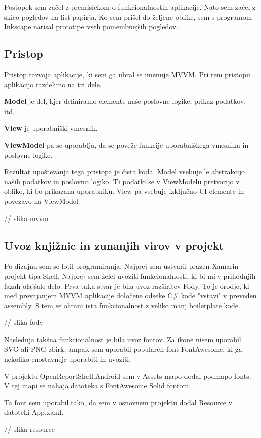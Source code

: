 \documentclass[a4paper, 12pt]{book}
\begin{document}
Postopek sem začel z premislekom o funkcionalnostih aplikacije.
Nato sem začel z skico pogledov na list papirja.
Ko sem prišel do željene oblike, sem s programom Inkscape narisal prototipe vseh pomembnejših pogledov.

\subsection{Pristop}
Pristop razvoja aplikacije, ki sem ga ubral se imenuje MVVM.
Pri tem pristopu aplikacijo razdelimo na tri dele.

\textbf{Model} je del, kjer definiramo elemente naše poslovne logike, prikaz podatkov, itd.

\textbf{View} je uporabniški vmesnik.

\textbf{ViewModel} pa se uporablja, da se poveže funkcije uporabniškega vmesnika in poslovne logike.

Rezultat upoštevanja tega pristopa je čista koda.
Model vsebuje le abstrakcijo naših podatkov in poslovno logiko.
Ti podatki se v ViewModelu pretvorijo v obliko, ki bo prikazana uporabniku.
View pa vsebuje izključno UI elemente in povezavo na ViewModel.

// slika mvvm

\subsection{Uvoz knjižnic in zunanjih virov v projekt}
Po dizajnu sem se lotil programiranja.
Najprej sem ustvaril prazen Xamarin projekt tipa Shell.
Najprej sem želel uvoziti funkcionalnosti, ki bi mi v prihodnjih fazah olajšale delo.
Prva taka stvar je bila uvoz razširitev Fody.
To je orodje, ki med prevajanjem MVVM aplikacije določene odseke C\# kode "vstavi" v preveden assembly.
S tem se ohrani ista funkcionalnost z veliko manj boilerplate kode.

// slika fody

Naslednja takšna funkcionalnost je bila uvoz fontov.
Za ikone nisem uporabil SVG ali PNG zbirk, ampak sem uporabil popularen font FontAwesome, ki ga nekoliko enostavneje uporabiti in uvoziti.

V projektu OpenReportShell.Android sem v Assets mapo dodal podmapo fonts.
V tej mapi se nahaja datoteka s FontAwesome Solid fontom.

Ta font sem uporabil tako, da sem v osnovnem projektu dodal Resource v datoteki App.xaml.

// slika resource
\end{document}
